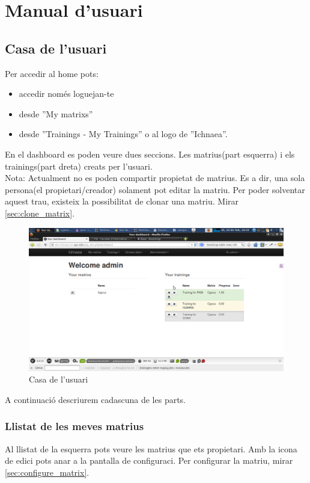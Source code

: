\chapter{Manual d'usuari}
\label{cha:userguide}

\section{Casa de l'usuari}
\label{sec:home}
Per accedir al home pots:
\begin{itemize}
\item accedir nom\'{e}s loguejan-te 
\item desde ''My matrixs''
\item desde ''Trainings - My Trainings'' o al logo de ''Ichnaea''.
\end{itemize}

En el dashboard es poden veure dues seccions. Les matrius(part esquerra) i els trainings(part dreta) creats per l'usuari.\\
Nota: Actualment no es poden compartir propietat de matrius. Es a dir, una sola persona(el propietari/creador) solament pot editar la matriu. Per poder solventar aquest trau, existeix la possibilitat de clonar una matriu. Mirar \ref{sec:clone_matrix}.
\begin{figure}[h!]
  \centering
  \includegraphics[scale=0.2]{img/userguide/dashboard_complete_trainings.png}
  \caption{Casa de l'usuari}
  \label{fig:placement}
\end{figure}
A continuaci\'{o} descriurem cadascuna de les parts.

\subsection{Llistat de les meves matrius}
Al llistat de la esquerra pots veure les matrius que ets propietari. Amb la icona de edici pots anar a la pantalla de configuraci. Per configurar la matriu, mirar \ref{sec:configure_matrix}.

